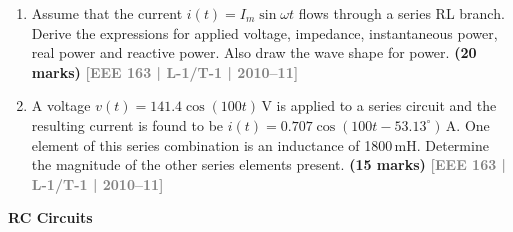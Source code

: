 \documentclass[12pt,a3paper]{article}
\newcommand{\yr}[1]{\hfill\textcolor{gray}{\small\textbf{[#1]}}}
\newcommand{\mk}[1]{\textcolor{orange!70!black}{\small\textbf{(#1 marks)}}}
\newcommand{\subtopic}[2]{%
  \vspace{10pt}
  \noindent\begin{tcolorbox}[colback=#1!8,colframe=#1,boxrule=0.6pt,arc=4pt,
    left=6pt,right=6pt,top=4pt,bottom=4pt]
    \small\bfseries\textcolor{#1}{#2}
  \end{tcolorbox}
  \vspace{2pt}
}
\begin{document}
\begin{enumerate}
\item Assume that the current $i(t) = I_m\sin\omega t$ flows through a series RL branch. Derive the expressions for applied voltage, impedance, instantaneous power, real power and reactive power. Also draw the wave shape for power.
\mk{20} \yr{EEE 163 | L-1/T-1 | 2010--11}

\item A voltage $v(t) = 141.4\cos(100t)$\,V is applied to a series circuit and the resulting current is found to be $i(t) = 0.707\cos(100t - 53.13^\circ)$\,A. One element of this series combination is an inductance of 1800\,mH. Determine the magnitude of the other series elements present.
\mk{15} \yr{EEE 163 | L-1/T-1 | 2010--11}

\end{enumerate}

\subtopic{cB}{RC Circuits}
\label{sub:s2-rc}
\end{document}
